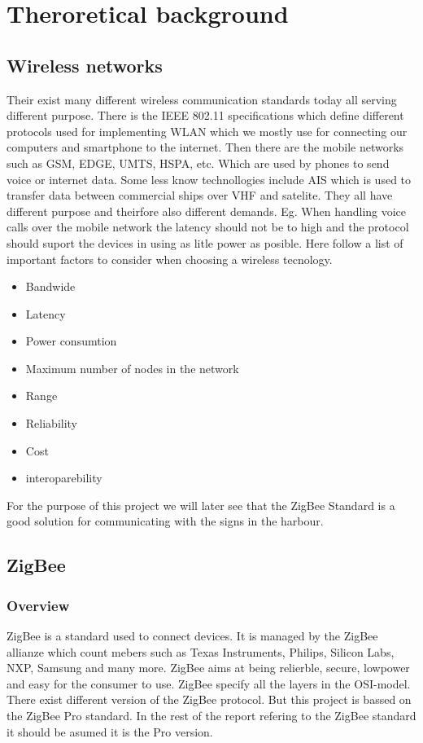 \documentclass[a4paper,12pt,english]{article}
\begin{document}
\section{Theroretical background}
\subsection{Wireless networks}
Their exist many different wireless communication standards today all serving
different purpose. There is the IEEE 802.11 specifications which define
different protocols used for implementing WLAN which we mostly use for
connecting our computers and smartphone to the internet. Then there are the
mobile networks such as GSM, EDGE, UMTS, HSPA, etc. Which are used by phones to
send voice or internet data. Some less know technollogies include AIS
 which is used to transfer
data between commercial ships over VHF and satelite. They all have different
purpose and theirfore also different demands. Eg. When handling voice calls
over the mobile network the latency should not be to high and the protocol
should suport the devices in using as litle power as posible. Here follow a list
of important factors to consider when choosing a wireless tecnology.
\begin{itemize}
  \item Bandwide
  \item Latency
  \item Power consumtion
  \item Maximum number of nodes in the network
  \item Range
  \item Reliability
  \item Cost
  \item interoparebility 
\end{itemize}

For the purpose of this project we will later see that the
ZigBee Standard is a good solution for communicating with the signs in the
harbour.

\subsection{ZigBee}
\subsubsection{Overview}
ZigBee is a standard used to connect devices. It is managed by the ZigBee
allianze which count mebers such as Texas Instruments, Philips, Silicon
Labs, NXP, Samsung and many more. ZigBee aims at being relierble, secure,
lowpower and easy for the consumer to use. ZigBee specify all the layers
in the OSI-model. There exist different version of the ZigBee protocol. But this project
is bassed on the ZigBee Pro standard. In the rest of the report refering to the
ZigBee standard it should be asumed it is the Pro version.
\end{document}

